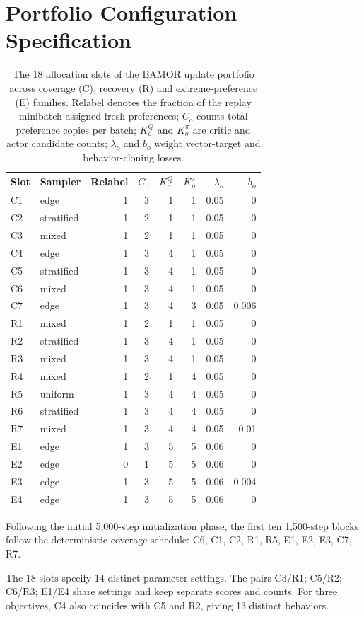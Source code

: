 \section{Portfolio Configuration Specification}
\label{app:operators}
\begin{table}[ht]
\centering\small
\caption{The 18 allocation slots of the BAMOR update portfolio across coverage
(C), recovery (R) and extreme-preference (E) families. Relabel denotes the
fraction of the replay minibatch assigned fresh preferences; $C_o$ counts total
preference copies per batch; $K_o^Q$ and $K_o^\pi$ are critic and actor
candidate counts; $\lambda_o$ and $b_o$ weight vector-target and
behavior-cloning losses.}
\label{tab:operators}
\begin{tabular}{llrrrrrr}
\toprule
Slot & Sampler & Relabel & $C_o$ & $K_o^Q$ & $K_o^\pi$ & $\lambda_o$ & $b_o$\\
\midrule
C1 & edge & 1 & 3 & 1 & 1 & 0.05 & 0 \\
C2 & stratified & 1 & 2 & 1 & 1 & 0.05 & 0 \\
C3 & mixed & 1 & 2 & 1 & 1 & 0.05 & 0 \\
C4 & edge & 1 & 3 & 4 & 1 & 0.05 & 0 \\
C5 & stratified & 1 & 3 & 4 & 1 & 0.05 & 0 \\
C6 & mixed & 1 & 3 & 4 & 1 & 0.05 & 0 \\
C7 & edge & 1 & 3 & 4 & 3 & 0.05 & 0.006 \\
\midrule
R1 & mixed & 1 & 2 & 1 & 1 & 0.05 & 0 \\
R2 & stratified & 1 & 3 & 4 & 1 & 0.05 & 0 \\
R3 & mixed & 1 & 3 & 4 & 1 & 0.05 & 0 \\
R4 & mixed & 1 & 2 & 1 & 4 & 0.05 & 0 \\
R5 & uniform & 1 & 3 & 4 & 4 & 0.05 & 0 \\
R6 & stratified & 1 & 3 & 4 & 4 & 0.05 & 0 \\
R7 & mixed & 1 & 3 & 4 & 4 & 0.05 & 0.01 \\
\midrule
E1 & edge & 1 & 3 & 5 & 5 & 0.06 & 0 \\
E2 & edge & 0 & 1 & 5 & 5 & 0.06 & 0 \\
E3 & edge & 1 & 3 & 5 & 5 & 0.06 & 0.004 \\
E4 & edge & 1 & 3 & 5 & 5 & 0.06 & 0 \\
\bottomrule
\end{tabular}
\end{table}

Following the initial 5,000-step initialization phase, the first ten
1,500-step blocks follow the deterministic coverage schedule:
C6, C1, C2, R1, R5, E1, E2, E3, C7, R7.

The 18 slots specify 14 distinct parameter settings. The pairs C3/R1; C5/R2; C6/R3; E1/E4 share settings and keep separate scores and counts. For three objectives, C4 also coincides with C5 and R2, giving 13 distinct behaviors.
